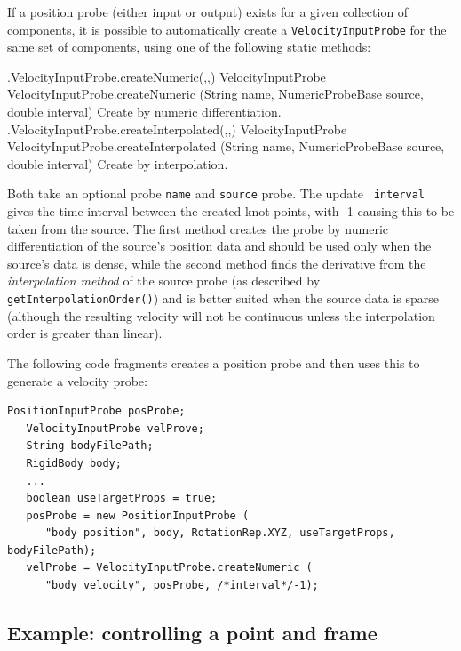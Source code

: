 If a position probe (either input or output) exists for a given collection of
components, it is possible to automatically create a {\tt VelocityInputProbe}
for the same set of components, using one of the following static methods:
%
\begin{methodtable}{0.65}{0.35}
\midline
%
\methodentry
{\probes.VelocityInputProbe.createNumeric(,,)}%
{VelocityInputProbe VelocityInputProbe.createNumeric (String name,\brh 
NumericProbeBase source, double interval)}%
{Create by numeric differentiation.}%
%
\methodspace{0.5em}%
\methodentry
{\probes.VelocityInputProbe.createInterpolated(,,)}%
{VelocityInputProbe VelocityInputProbe.createInterpolated (String name,\brh 
NumericProbeBase source, double interval)}%
{Create by interpolation.}%
%
\midline
\end{methodtable}
%
Both take an optional probe {\tt name} and {\tt source} probe. The update {\tt
interval} gives the time interval between the created knot points, with -1
causing this to be taken from the source. The first method creates the probe by
numeric differentiation of the source's position data and should be used only
when the source's data is dense, while the second method finds the derivative
from the {\it interpolation method} of the source probe (as described by {\tt
getInterpolationOrder()}) and is better suited when the source data is sparse
(although the resulting velocity will not be continuous unless the
interpolation order is greater than linear).

The following code fragments creates a position probe and then uses this to
generate a velocity probe:
%
\begin{lstlisting}[]
   PositionInputProbe posProbe;
   VelocityInputProbe velProve;
   String bodyFilePath;
   RigidBody body; 
   ...
   boolean useTargetProps = true;
   posProbe = new PositionInputProbe (
      "body position", body, RotationRep.XYZ, useTargetProps, bodyFilePath);
   velProbe = VelocityInputProbe.createNumeric (
      "body velocity", posProbe, /*interval*/-1);
\end{lstlisting}
%

\subsection{Example: controlling a point and frame}

